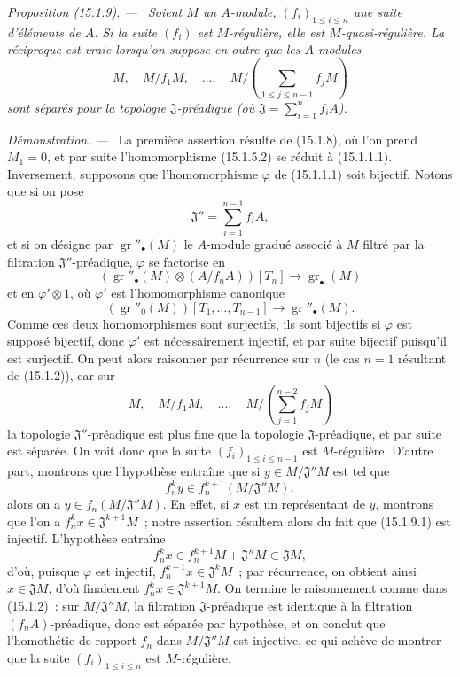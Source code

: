 \documentclass[10pt,oneside]{book}
\makeatletter
\newcommand{\gr}{\operatorname{gr}}
\newcommand{\setmanualcurrentlabel}[1]{\def\@currentlabel{#1}}
\newcommand{\oldpage}[2][]{%
  \setcounter{footnote}{0}%
  \marginpar{\scriptsize\textbf{#1}~|~#2}\ignorespaces}
\newenvironment{proposition}[1][]{%
  \setmanualcurrentlabel{#1}\par\medskip\noindent\itshape Proposition (#1). ---\ }{\par}
\newenvironment{proof}{%
  \par\medskip\noindent\textit{Démonstration. ---\ }}{\par}
\makeatother
\begin{document}
\begin{proposition}[15.1.9]
\label{0.15.1.9-fr}
Soient $M$ un $A$-module, $(f_i)_{1\leq i\leq n}$ une suite d'éléments de $A$.
Si la suite $(f_i)$ est $M$-régulière, elle est $M$-quasi-régulière. La
réciproque est vraie lorsqu'on suppose en outre que les $A$-modules
\[
  M,\quad M/f_1M,\quad\ldots,\quad
  M/\left(\sum_{1\leq j\leq n-1}f_jM\right)
\]
sont séparés pour la topologie $\mathfrak{J}$-préadique (où
$\mathfrak{J}=\sum_{i=1}^n f_iA$).
\end{proposition}

\begin{proof}
La première assertion résulte de (15.1.8), où l'on prend $M_1=0$, et par suite
l'homomorphisme (15.1.5.2) se réduit à (15.1.1.1). Inversement, supposons que
l'homomorphisme $\varphi$ de (15.1.1.1) soit bijectif. Notons que si on pose
\[
  \mathfrak{J}''=\sum_{i=1}^{n-1}f_iA,
\]
\oldpage[0\textsubscript{IV-1}]{16}
et si on désigne par $\gr''_\bullet(M)$ le $A$-module gradué associé à $M$
filtré par la filtration $\mathfrak{J}''$-préadique, $\varphi$ se factorise en
\[
  (\gr''_\bullet(M)\otimes(A/f_nA))[T_n]\longrightarrow\gr_\bullet(M)
  \tag{15.1.9.1}\label{0.15.1.9.1-fr}
\]
et en $\varphi'\otimes1$, où $\varphi'$ est l'homomorphisme canonique
\[
  (\gr''_0(M))[T_1,\ldots,T_{n-1}]
  \longrightarrow\gr''_\bullet(M).
\]
Comme ces deux homomorphismes sont surjectifs, ils sont bijectifs si
$\varphi$ est supposé bijectif, donc $\varphi'$ est nécessairement injectif,
et par suite bijectif puisqu'il est surjectif. On peut alors raisonner par
récurrence sur $n$ (le cas $n=1$ résultant de (15.1.2)), car sur
\[
  M,\quad M/f_1M,\quad\ldots,\quad
  M/\left(\sum_{j=1}^{n-2}f_jM\right)
\]
la topologie $\mathfrak{J}''$-préadique est plus fine que la topologie
$\mathfrak{J}$-préadique, et par suite est séparée. On voit donc que la suite
$(f_i)_{1\leq i\leq n-1}$ est $M$-régulière. D'autre part, montrons que
l'hypothèse entraîne que si $y\in M/\mathfrak{J}''M$ est tel que
\[
  f_n^ky\in f_n^{k+1}(M/\mathfrak{J}''M),
\]
alors on a $y\in f_n(M/\mathfrak{J}''M)$. En effet, si $x$ est un représentant
de $y$, montrons que l'on a $f_n^kx\in\mathfrak{J}^{k+1}M$~; notre assertion
résultera alors du fait que (15.1.9.1) est injectif. L'hypothèse entraîne
\[
  f_n^kx\in f_n^{k+1}M+\mathfrak{J}''M\subset\mathfrak{J}M,
\]
d'où, puisque $\varphi$ est injectif,
$f_n^{k-1}x\in\mathfrak{J}^kM$~; par récurrence, on obtient ainsi
$x\in\mathfrak{J}M$, d'où finalement
$f_n^kx\in\mathfrak{J}^{k+1}M$. On termine le raisonnement comme dans
(15.1.2)~: sur $M/\mathfrak{J}''M$, la filtration
$\mathfrak{J}$-préadique est identique à la filtration
$(f_nA)$-préadique, donc est séparée par hypothèse, et on conclut que
l'homothétie de rapport $f_n$ dans $M/\mathfrak{J}''M$ est injective, ce qui
achève de montrer que la suite $(f_i)_{1\leq i\leq n}$ est $M$-régulière.
\end{proof}
\end{document}
